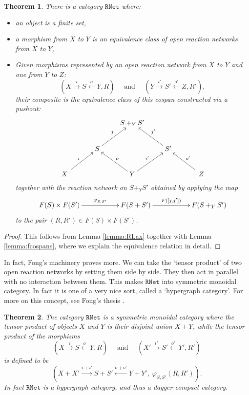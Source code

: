 \documentclass{compositionalityarticle}
\newcommand{\RNet}{\mathtt{RNet}}
\theoremstyle{plain}
\newtheorem{thm}{Theorem}
\theoremstyle{remark}
\begin{document}
\begin{thm}
There is a category $\RNet$ where:
\begin{itemize}
\item an object is a finite set,
\item a morphism from $X$ to $Y$ is an equivalence class of open reaction networks 
from $X$ to $Y$, 
\item Given morphisms represented by an open reaction network from $X$ to $Y$ and one from $Y$ to $Z$:
 \[
    (X \stackrel{i}\longrightarrow S \stackrel{o}\longleftarrow Y, R) 
    \quad \textrm{ and } \quad
    (Y \stackrel{i'}\longrightarrow S' \stackrel{o'}\longleftarrow Z, R'), 
  \]
their composite is the equivalence class of this cospan constructed via a pushout:
  \[
    \xymatrix{
      && S +_Y S' \\
      & S \ar[ur]^{j} && S' \ar[ul]_{j'} \\
      \quad X\quad \ar[ur]^{i} && Y \ar[ul]_{o} \ar[ur]^{i'} &&\quad Z \quad \ar[ul]_{o'}
    }
  \]
together with the reaction network on $S +_Y S'$ obtained by applying the map
\[      
\xymatrix{      F(S) \times F(S') \ar[rr]^-{\varphi_{S,S'}} && 
                     F(S + S') \ar[rr]^-{F([j,j'])} && F(S +_Y S') } \]
to the pair $(R,R') \in F(S) \times F(S')$.  
\end{itemize}
\end{thm}

\begin{proof}
This follows from Lemma \ref{lemma:RLax} together with Lemma 
\ref{lemma:fcospans}, where we explain the equivalence relation in detail.  
\end{proof}

In fact, Fong's machinery proves more.  We can take the `tensor product' of  two open reaction networks by setting them side by side.  They then act in parallel with no interaction between them.  This makes $\RNet$ into symmetric monoidal category. 
In fact it is one of a very nice sort, called a `hypergraph category'.  For more on this concept, see Fong's thesis \cite{FongThesis}.

\begin{thm}
The category $\RNet$ is a symmetric monoidal category where the tensor product of objects $X$ and $Y$ is their disjoint union $X + Y$, while the tensor product of the morphisms
\[
    (X \stackrel{i}{\longrightarrow} S \stackrel{o}{\longleftarrow} Y, R) 
    \quad \textrm{ and } \quad
    (X' \stackrel{i'}{\longrightarrow} S' \stackrel{o'}{\longleftarrow} Y', R') 
  \]
is defined to be
\[  ( X + X' \stackrel{i+i'}{\longrightarrow} S + S'  \stackrel{o + o'}{\longleftarrow} Y + Y', \;
\varphi_{S,S'}(R,R') ) .\]
In fact $\RNet$ is a hypergraph category, and thus a dagger-compact category.
\end{thm}
\end{document}
